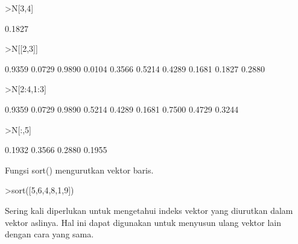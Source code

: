 \documentclass{article}
\begin{document}
\begin{eulernotebook}
\begin{euleroutput}
\end{euleroutput}
\begin{eulerprompt}
>N[3,4]
\end{eulerprompt}
\begin{euleroutput}
       0.1827 
\end{euleroutput}
\begin{eulerprompt}
>N[[2,3]]
\end{eulerprompt}
\begin{euleroutput}
       0.9359      0.0729      0.9890      0.0104      0.3566 
       0.5214      0.4289      0.1681      0.1827      0.2880 
\end{euleroutput}
\begin{eulerprompt}
>N[2:4,1:3]
\end{eulerprompt}
\begin{euleroutput}
       0.9359      0.0729      0.9890 
       0.5214      0.4289      0.1681 
       0.7500      0.4729      0.3244 
\end{euleroutput}
\begin{eulerprompt}
>N[:,5]
\end{eulerprompt}
\begin{euleroutput}
       0.1932 
       0.3566 
       0.2880 
       0.1955 
\end{euleroutput}
\begin{eulercomment}
Fungsi sort() mengurutkan vektor baris.
\end{eulercomment}
\begin{eulerprompt}
>sort([5,6,4,8,1,9])
\end{eulerprompt}
\begin{euleroutput}
  [1,  4,  5,  6,  8,  9]
\end{euleroutput}
\begin{eulercomment}
Sering kali diperlukan untuk mengetahui indeks vektor yang diurutkan
dalam vektor aslinya. Hal ini dapat digunakan untuk menyusun ulang
vektor lain dengan cara yang sama.



\end{eulercomment}
\end{eulernotebook}
\end{document}
